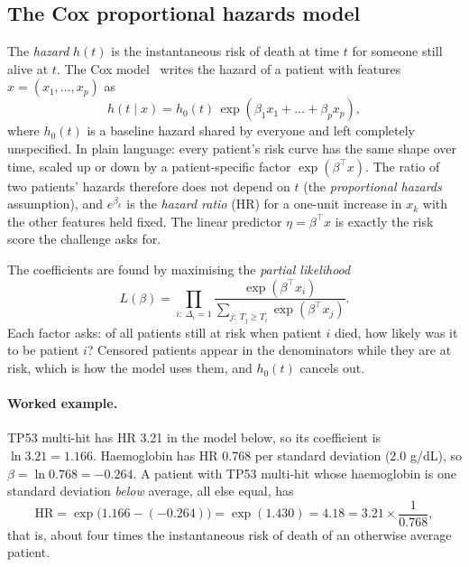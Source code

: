 \documentclass[11pt,a4paper]{article}
\begin{document}
\subsection{The Cox proportional hazards model}
The \emph{hazard} $h(t)$ is the instantaneous risk of death at time $t$ for someone still
alive at $t$. The Cox model~\cite{cox1972} writes the hazard of a patient with features
$x = (x_1, \dots, x_p)$ as
\begin{equation}
h(t \mid x) = h_0(t)\, \exp\!\left(\beta_1 x_1 + \dots + \beta_p x_p\right),
\label{eq:cox}
\end{equation}
where $h_0(t)$ is a baseline hazard shared by everyone and left completely unspecified.
In plain language: every patient's risk curve has the same shape over time, scaled up or
down by a patient-specific factor $\exp(\beta^\top x)$. The ratio of two patients' hazards
therefore does not depend on $t$ (the \emph{proportional hazards} assumption), and
$e^{\beta_k}$ is the \emph{hazard ratio} (HR) for a one-unit increase in $x_k$ with the
other features held fixed. The linear predictor $\eta = \beta^\top x$ is exactly the risk
score the challenge asks for.

The coefficients are found by maximising the \emph{partial likelihood}
\begin{equation}
L(\beta) = \prod_{i:\ \Delta_i = 1}
\frac{\exp(\beta^\top x_i)}{\sum_{j:\ T_j \ge T_i} \exp(\beta^\top x_j)}.
\label{eq:partial}
\end{equation}
Each factor asks: of all patients still at risk when patient $i$ died, how likely was it
to be patient $i$? Censored patients appear in the denominators while they are at risk,
which is how the model uses them, and $h_0(t)$ cancels out.

\paragraph{Worked example.} TP53 multi-hit has HR 3.21 in the model below, so its
coefficient is $\ln 3.21 = 1.166$. Haemoglobin has HR 0.768 per standard deviation (2.0
g/dL), so $\beta = \ln 0.768 = -0.264$. A patient with TP53 multi-hit whose haemoglobin is
one standard deviation \emph{below} average, all else equal, has
\[
\text{HR} = \exp\!\big(1.166 - (-0.264)\big) = \exp(1.430) = 4.18
= 3.21 \times \frac{1}{0.768},
\]
that is, about four times the instantaneous risk of death of an otherwise average patient.
\end{document}
